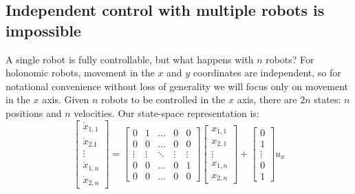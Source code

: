 \subsection{Independent control with multiple robots is impossible}
A single robot is fully controllable, but what happens with $n$ robots? For holonomic robots, movement in the $x$ and $y$ coordinates are independent, so for notational convenience without loss of generality we will focus only on movement in the $x$ axis. Given $n$ robots to be  controlled in the $x$ axis, there are $2n$ states: $n$ positions and $n$ velocities.
Our state-space representation is:
\begin{equation}
\begin{bmatrix}
\dot{x}_{1,1}\\ 
\dot{x}_{2.1}\\
\vdots\\
\dot{x}_{1,n}\\
\dot{x}_{2,n}

\end{bmatrix} = \begin{bmatrix}
0 & 1 & \ldots & 0 & 0 \\
0 & 0 & \ldots& 0 & 0 \\
\vdots &  \vdots & \ddots & \vdots & \vdots \\
0 & 0  & \ldots & 0 & 1 \\
0 & 0 & \ldots& 0 & 0 
\end{bmatrix}  \begin{bmatrix}
x_{1,1}\\
x_{2,1}\\
\vdots \\
x_{1,n}\\
x_{2,n}
\end{bmatrix} + \begin{bmatrix}
0\\
1\\
\vdots\\
0\\
1
\end{bmatrix} u_x
\end{equation}
